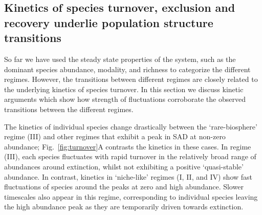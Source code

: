 \documentclass[9pt,twocolumn,twoside,lineno]{pnas-new}
\begin{document}





\subsection{Kinetics of species turnover, exclusion and recovery underlie population structure transitions}
\label{sec:Dynamics}

So far we have used the steady state properties of the system, such as the dominant species abundance, modality, and richness to categorize the different regimes. 
However, the transitions between different regimes are closely related to the underlying kinetics of species turnover.
In this section we discuss kinetic arguments which show how strength of fluctuations corroborate the observed transitions between the different regimes.

The kinetics of individual species change drastically between the `rare-biosphere' regime (III) and other regimes that exhibit a peak in SAD at non-zero abundance; Fig.~\ref{fig:turnover}A contrasts the kinetics in these cases. 
In regime (III), each species fluctuates with rapid turnover in the relatively broad range of abundances around extinction,  whilst not exhibiting a positive `quasi-stable' abundance.  
In contrast, kinetics in `niche-like' regimes (I, II, and IV) show fast fluctuations of species around the peaks at zero and high abundance.
Slower timescales also appear in this regime, corresponding to individual species leaving the high abundance peak as they are temporarily driven towards extinction.
\end{document}
